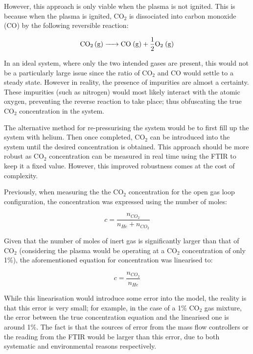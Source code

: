 However, this approach is only viable when the plasma is not ignited. This is because when the plasma is ignited, CO$_2$ is dissociated into carbon monoxide (CO) by the following reversible reaction:

\begin{equation}
    \ce{CO_2 (g) -> CO (g) + \frac{1}{2}O_2 (g)}
\end{equation}

In an ideal system, where only the two intended gases are present, this would not be a particularly large issue since the ratio of CO$_2$ and CO would settle to a steady state. However in reality, the presence of impurities are almost a certainty. These impurities (such as nitrogen) would most likely interact with the atomic oxygen, preventing the reverse reaction to take place; thus obfuscating the true CO$_2$ concentration in the system. 

The alternative method for re-pressurising the system would be to first fill up the system with helium. Then once completed, CO$_2$ can be introduced into the system until the desired concentration is obtained. This approach should be more robust as CO$_2$ concentration can be measured in real time using the FTIR to keep it a fixed value. However, this improved robustness comes at the cost of complexity. 

Previously, when measuring the the CO$_2$ concentration for the open gas loop configuration, the concentration was expressed using the number of moles:

\begin{equation}
    c = \frac{n_{CO_2}}{n_{He} + n_{CO_2}}
\end{equation}

Given that the number of moles of inert gas is significantly larger than that of CO$_2$ (considering the plasma would be operating at a CO$_2$ concentration of only 1\%), the aforementioned equation for concentration was linearised to:

\begin{equation}
    c = \frac{n_{CO_2}}{n_{He}}
    \label{eq:linearised_conc_moles}
\end{equation}

While this linearisation would introduce some error into the model, the reality is that this error is very small; for example, in the case of a 1\% CO$_2$ gas mixture, the error between the true concentration equation and the linearised one is around 1\%. The fact is that the sources of error from the mass flow controllers or the reading from the FTIR would be larger than this error, due to both systematic and environmental reasons respectively. 

